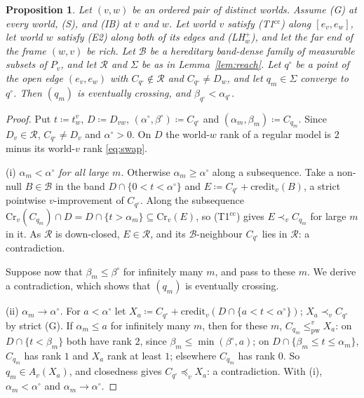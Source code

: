 \documentclass[11pt]{article}
\newtheorem{proposition}[theorem]{Proposition}
\theoremstyle{definition}\newtheorem{definition}[theorem]{Definition}
\theoremstyle{remark}\newtheorem{remark}[theorem]{Remark}
\newcommand{\cred}{\mathrm{credit}}
\newcommand{\Bfam}{\mathcal B}
\newcommand{\pw}{\mathrm{pw}}
\newcommand{\Tcc}{\textup{(T1$^{\mathrm{cc}}$)}}
\begin{document}
\begin{proposition}\label{prop:nocross}
Let $(v,w)$ be an ordered pair of distinct worlds. Assume (G) at every
world, (S), and (IB) at $v$ and $w$. Let world $v$ satisfy \Tcc{} along
$[e_v,e_w]$, let world $w$ satisfy (E2) along both of its edges and
(LH$^+_w$), and let the far end of the frame $(w,v)$ be rich. Let $\Bfam$ be
a hereditary band-dense family of measurable subsets of $P_v$, and let
$\mathcal R$ and $\Sigma$ be as in Lemma~\ref{lem:reach}. Let $q^\circ$ be a
point of the open edge $(e_v,e_w)$ with $C_{q^\circ}\notin\mathcal R$ and
$C_{q^\circ}\ne D_w$, and let $q_m\in\Sigma$ converge to $q^\circ$. Then
$(q_m)$ is eventually crossing, and $\beta_{q^\circ}<\alpha_{q^\circ}$.
\end{proposition}
\begin{proof}
Put $t\coloneqq t^v_w$, $D\coloneqq D_{vw}$,
$(\alpha^\circ,\beta^\circ)\coloneqq C_{q^\circ}$ and
$(\alpha_m,\beta_m)\coloneqq C_{q_m}$. Since $D_v\in\mathcal R$,
$C_{q^\circ}\ne D_v$ and $\alpha^\circ>0$. On $D$ the world-$w$ rank of a
regular model is $2$ minus its world-$v$ rank \eqref{eq:swap}.

(i) \emph{$\alpha_m<\alpha^\circ$ for all large $m$.} Otherwise
$\alpha_m\ge\alpha^\circ$ along a subsequence. Take a non-null $B\in\Bfam$
in the band $D\cap\{0<t<\alpha^\circ\}$ and $E\coloneqq
C_{q^\circ}+\cred_v(B)$, a strict pointwise $v$-improvement of
$C_{q^\circ}$. Along the subsequence $\mathrm{Cr}_v(C_{q_m})\cap D=
D\cap\{t>\alpha_m\}\subseteq\mathrm{Cr}_v(E)$, so \Tcc{} gives
$E\prec_vC_{q_m}$ for large $m$ in it. As $\mathcal R$ is down-closed,
$E\in\mathcal R$, and its $\Bfam$-neighbour $C_{q^\circ}$ lies in
$\mathcal R$: a contradiction.

Suppose now that $\beta_m\le\beta^\circ$ for infinitely many $m$, and pass
to these $m$. We derive a contradiction, which shows that $(q_m)$ is
eventually crossing.

(ii) \emph{$\alpha_m\to\alpha^\circ$.} For $a<\alpha^\circ$ let $X_a\coloneqq
C_{q^\circ}+\cred_v(D\cap\{a<t<\alpha^\circ\})$; $X_a\prec_vC_{q^\circ}$ by
strict (G). If $\alpha_m\le a$ for infinitely many $m$, then for these $m$,
$C_{q_m}\le^v_\pw X_a$: on $D\cap\{t<\beta_m\}$ both have rank $2$, since
$\beta_m\le\min(\beta^\circ,a)$; on $D\cap\{\beta_m\le t\le\alpha_m\}$,
$C_{q_m}$ has rank $1$ and $X_a$ rank at least $1$; elsewhere $C_{q_m}$ has
rank $0$. So $q_m\in A_v(X_a)$, and closedness gives $C_{q^\circ}
\preceq_vX_a$: a contradiction. With (i), $\alpha_m<\alpha^\circ$ and
$\alpha_m\to\alpha^\circ$.


\end{proof}
\end{document}

